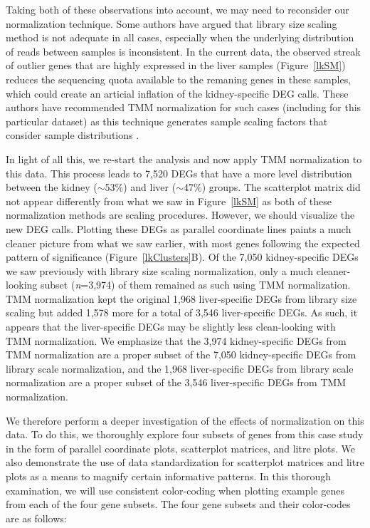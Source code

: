\documentclass{bmcart}
\begin{document}
\begin{linenumbers}
\begin{doublespacing}
Taking both of these observations into account, we may need to reconsider our normalization technique. Some authors have argued that library size scaling method is not adequate in all cases, especially when the underlying distribution of reads between samples is inconsistent. In the current data, the observed streak of outlier genes that are highly expressed in the liver samples (Figure~\ref{lkSM}) reduces the sequencing quota available to the remaning genes in these samples, which could create an articial inflation of the kidney-specific DEG calls. These authors have recommended TMM normalization for such cases (including for this particular dataset) as this technique generates sample scaling factors that consider sample distributions \cite{RobinsonOshlack}.

In light of all this, we re-start the analysis and now apply TMM normalization to this data. This process leads to 7,520 DEGs that have a more level distribution between the kidney ($\sim$53\%) and liver ($\sim$47\%) groups. The scatterplot matrix did not appear differently from what we saw in Figure~\ref{lkSM} as both of these normalization methods are scaling procedures. However, we should visualize the new DEG calls. Plotting these DEGs as parallel coordinate lines paints a much cleaner picture from what we saw earlier, with most genes following the expected pattern of significance (Figure~\ref{lkClusters}B). Of the 7,050 kidney-specific DEGs we saw previously with library size scaling normalization, only a much cleaner-looking subset (\textit{n}=3,974) of them remained as such using TMM normalization. TMM normalization kept the original 1,968 liver-specific DEGs from library size scaling but added 1,578 more for a total of 3,546 liver-specific DEGs. As such, it appears that the liver-specific DEGs may be slightly less clean-looking with TMM normalization. We emphasize that the 3,974 kidney-specific DEGs from TMM normalization are a proper subset of the 7,050 kidney-specific DEGs from library scale normalization, and the 1,968 liver-specific DEGs from library scale normalization are a proper subset of the 3,546 liver-specific DEGs from TMM normalization. 

We therefore perform a deeper investigation of the effects of normalization on this data. To do this, we thoroughly explore four subsets of genes from this case study in the form of parallel coordinate plots, scatterplot matrices, and litre plots. We also demonstrate the use of data standardization for scatterplot matrices and litre plots as a means to magnify certain informative patterns. In this thorough examination, we will use consistent color-coding when plotting example genes from each of the four gene subsets. The four gene subsets and their color-codes are as follows:


\end{doublespacing}
\end{linenumbers}
\end{document}
